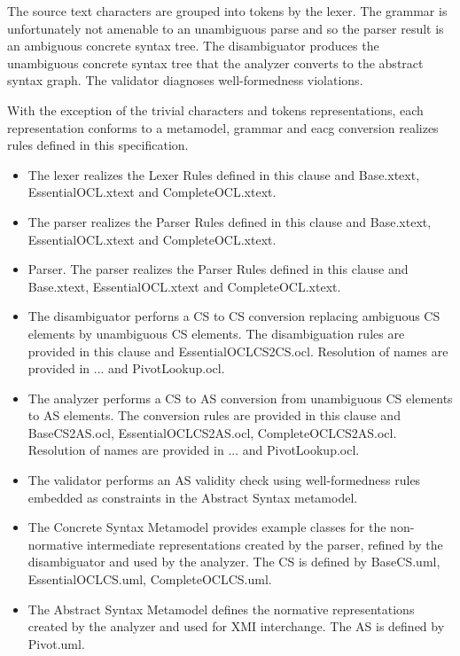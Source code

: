 \documentclass{scrreprt}   %
\begin{document}
The source text characters are grouped into tokens by the lexer. The grammar is unfortunately not amenable to an unambiguous parse and so the parser result is an ambiguous concrete syntax tree. The disambiguator produces the unambiguous concrete syntax tree that the analyzer converts to the abstract syntax graph. The validator diagnoses well-formedness violations.

With the exception of the trivial characters and tokens representations, each representation conforms to a metamodel, grammar and eacg conversion realizes rules defined in this specification.

\begin{itemize}
\item The lexer realizes the Lexer Rules defined in this clause and Base.xtext, EssentialOCL.xtext and CompleteOCL.xtext.
\item The parser realizes the Parser Rules defined in this clause and Base.xtext, EssentialOCL.xtext and CompleteOCL.xtext.
\item Parser. The parser realizes the Parser Rules defined in this clause and Base.xtext, EssentialOCL.xtext and CompleteOCL.xtext.
\item The disambiguator perforns a CS to CS conversion replacing ambiguous CS elements by unambiguous CS elements. The disambiguation rules are provided in this clause and EssentialOCLCS2CS.ocl. Resolution of names are provided in ... and PivotLookup.ocl.
\item The analyzer performs a CS to AS conversion from unambiguous CS elements to AS elements. The conversion rules are provided in this clause and BaseCS2AS.ocl, EssentialOCLCS2AS.ocl, CompleteOCLCS2AS.ocl. Resolution of names are provided in ... and PivotLookup.ocl.
\item The validator performs an AS validity check using well-formedness rules embedded as constraints in the Abstract Syntax metamodel.
\item The Concrete Syntax Metamodel provides example classes for the non-normative intermediate representations created by the parser, refined by the disambiguator and used by the analyzer.  The CS is defined by BaseCS.uml, EssentialOCLCS.uml, CompleteOCLCS.uml.
\item The Abstract Syntax Metamodel defines the normative representations created by the analyzer and used for XMI interchange.  The AS is defined by Pivot.uml.
\end{itemize}

\end{document}
